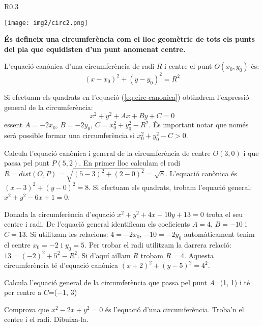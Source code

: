 \documentclass[11pt, a4paper, pdf]{article}
\begin{document}
\begin{theorybox}
	\begin{wrapfigure}{R}{0.3\textwidth} 
		\vspace{-0.5cm}
		\begin{center}
			\texttt{[image: img2/circ2.png]}
		\end{center}
	\end{wrapfigure}

\textbf{És defineix una circumferència com el lloc geomètric de tots els punts del pla
	que equidisten d'un punt anomenat centre.
}
	
	L'equació canònica d'una circumferència de radi $R$ i centre el punt $O(x_0, y_0)$ és:
	\begin{equation}
	\label{eq:circ-canonica}
	(x-x_0)^2+(y-y_0)^2=R^2
	\end{equation}
	
	Si efectuam els quadrats en l'equació (\ref{eq:circ-canonica}) obtindrem l'expressió general de la circumferència:
	\begin{equation}
	\label{eq:circ-genreal}
	x^2+y^2+Ax+By+C=0
	\end{equation}
	essent $A=-2x_0$, $B=-2y_0$, $C=x_0^2+y_0^2-R^2$. És important notar que només serà possible formar una circumferència si $x_0^2+y_0^2-C > 0$.
	
\end{theorybox}

\begin{resolt}[Exemple]{Calcula l'equació canònica i general de la circumferència de centre $O(3,0)$ i que passa pel punt $P(5,2)$.}
	En primer lloc calculam el radi $R=dist(O, P)=\sqrt{(5-3)^2+(2-0)^2}=\sqrt{8}$. L'equació canònica és $(x-3)^2+(y-0)^2=8$. Si efectuam els quadrats, trobam l'equació general: $x^2+y^2-6x+1=0$. 
\end{resolt}
\vspace{-0.75cm}
\begin{resolt}{Donada la circumferència d'equació $x^2+y^2+4x-10y+13=0$ troba el seu centre i radi.}
	De l'equació general identificam els coeficients $A=4$, $B=-10$ i $C=13$. Si utilitzam les relacions:  $4=-2x_0$,  $-10=-2y_0$ automàticament tenim el centre $x_0=-2$ i $y_0=5$. Per trobar el radi utilitzam la darrera relació: $13=(-2)^2+5^2-R^2$. Si d'aquí aïllam $R$ trobam $R=4$. Aquesta circumferència té d'equació canònica $(x+2)^2+(y-5)^2=4^2$.	
\end{resolt}

\begin{mylist}
	
	\item  Calcula l'equació general de la circumferència que passa pel punt \textit{A}=(1, 1) i té per centre a  $C$=($-$1, 3)
	
	\item  Comprova que $x^{2} -2x+y^{2} =0$ és l'equació d'una circumferència. Troba'n el centre i el radi. Dibuixa-la.
	
\end{mylist}
\end{document}
